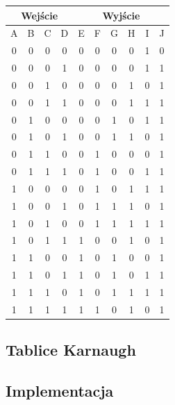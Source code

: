 \documentclass[a4paper]{article}
\begin{document}
\begin{center}
  \begin{tabular}{|c|c|c|c||c|c|c|c|c|c|}
  \hline \multicolumn{4}{|c||}{Wejście} & \multicolumn{6}{|c|}{Wyjście} \\
  \hline A & B & C & D & E & F & G & H & I & J \\
  \hline 0 & 0 & 0 & 0 & 0 & 0 & 0 & 0 & 1 & 0 \\
  \hline 0 & 0 & 0 & 1 & 0 & 0 & 0 & 0 & 1 & 1 \\
  \hline 0 & 0 & 1 & 0 & 0 & 0 & 0 & 1 & 0 & 1 \\
  \hline 0 & 0 & 1 & 1 & 0 & 0 & 0 & 1 & 1 & 1 \\
  \hline 0 & 1 & 0 & 0 & 0 & 0 & 1 & 0 & 1 & 1 \\
  \hline 0 & 1 & 0 & 1 & 0 & 0 & 1 & 1 & 0 & 1 \\
  \hline 0 & 1 & 1 & 0 & 0 & 1 & 0 & 0 & 0 & 1 \\
  \hline 0 & 1 & 1 & 1 & 0 & 1 & 0 & 0 & 1 & 1 \\
  \hline 1 & 0 & 0 & 0 & 0 & 1 & 0 & 1 & 1 & 1 \\
  \hline 1 & 0 & 0 & 1 & 0 & 1 & 1 & 1 & 0 & 1 \\
  \hline 1 & 0 & 1 & 0 & 0 & 1 & 1 & 1 & 1 & 1 \\
  \hline 1 & 0 & 1 & 1 & 1 & 0 & 0 & 1 & 0 & 1 \\
  \hline 1 & 1 & 0 & 0 & 1 & 0 & 1 & 0 & 0 & 1 \\
  \hline 1 & 1 & 0 & 1 & 1 & 0 & 1 & 0 & 1 & 1 \\
  \hline 1 & 1 & 1 & 0 & 1 & 0 & 1 & 1 & 1 & 1 \\
  \hline 1 & 1 & 1 & 1 & 1 & 1 & 0 & 1 & 0 & 1 \\

  \hline 
  \end{tabular}
\end{center}


\subsection{Tablice Karnaugh}
\subsection{Implementacja}
\end{document}

